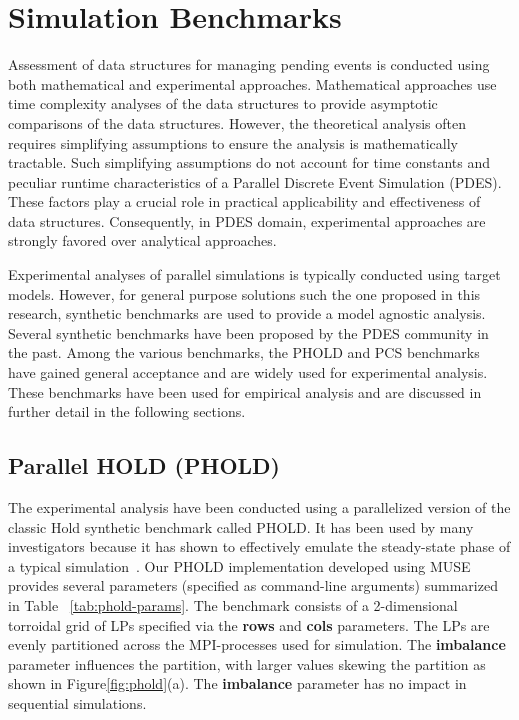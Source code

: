 \chapter{Simulation Benchmarks}  \label{sec:models}

Assessment of data structures for managing pending events is conducted
using both mathematical and experimental approaches.  Mathematical
approaches use time complexity analyses of the data structures to
provide asymptotic comparisons of the data structures.  However, the
theoretical analysis often requires simplifying assumptions to ensure
the analysis is mathematically tractable.  Such simplifying assumptions
do not account for time constants and peculiar runtime characteristics
of a Parallel Discrete Event Simulation (PDES).  These factors play a
crucial role in practical applicability and effectiveness of data
structures.  Consequently, in PDES domain, experimental approaches are
strongly favored over analytical approaches.

Experimental analyses of parallel simulations is typically conducted
using target models.  However, for general purpose solutions such the
one proposed in this research, synthetic benchmarks are used to
provide a model agnostic analysis.  Several synthetic benchmarks have
been proposed by the PDES community in the past.  Among the various
benchmarks, the PHOLD and PCS benchmarks have gained general
acceptance and are widely used for experimental analysis.  These
benchmarks have been used for empirical analysis and are discussed in
further detail in the following sections.

\section{Parallel HOLD (PHOLD)} \label{sec:pholdModel}
The experimental analysis have been conducted using a parallelized version of the classic Hold synthetic benchmark called PHOLD. It has been used by many investigators because it has shown to effectively emulate the steady-state phase of a typical simulation~\cite{franceschini-15,tang-05}. Our PHOLD
implementation developed using MUSE provides several parameters
(specified as command-line arguments) summarized in Table ~\ref{tab:phold-params}. The benchmark consists of a 2-dimensional torroidal grid of LPs specified via the \textbf{rows} and \textbf{cols} parameters. The LPs are evenly partitioned across the MPI-processes used for simulation. The \textbf{imbalance} parameter influences the partition, with larger values skewing the partition as shown in Figure\ref{fig:phold}(a). The \textbf{imbalance} parameter has no impact in sequential simulations.



